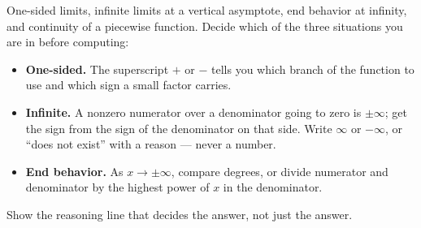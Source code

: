\documentclass[12pt]{article}
\begin{document}

\noindent\small
One-sided limits, infinite limits at a vertical asymptote, end behavior at
infinity, and continuity of a piecewise function. Decide which of the three
situations you are in before computing:
\begin{itemize}[leftmargin=1.1cm, itemsep=1pt, topsep=2pt]
  \item \textbf{One-sided.} The superscript $+$ or $-$ tells you which branch
        of the function to use and which sign a small factor carries.
  \item \textbf{Infinite.} A nonzero numerator over a denominator going to
        zero is $\pm\infty$; get the sign from the sign of the denominator on
        that side. Write $\infty$ or $-\infty$, or ``does not exist'' with a
        reason --- never a number.
  \item \textbf{End behavior.} As $x \to \pm\infty$, compare degrees, or
        divide numerator and denominator by the highest power of $x$ in the
        denominator.
\end{itemize}
Show the reasoning line that decides the answer, not just the answer.
\normalsize

\vspace{0.15cm}





\end{document}
